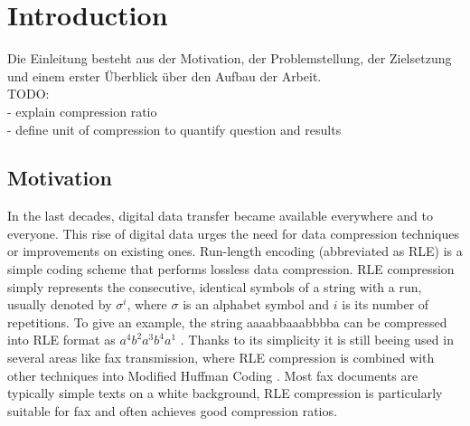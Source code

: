 
\chapter{Introduction}
\label{ch:Introduction}
Die Einleitung besteht aus der Motivation, der Problemstellung, der Zielsetzung und einem erster Überblick über den Aufbau der Arbeit. \\
TODO: \\
- explain compression ratio \\
- define unit of compression to quantify question and results \\

\section{Motivation}
\label{ch:Introduction:sec:Motivation}
\par{
In the last decades, digital data transfer became available everywhere and to everyone. This rise of digital data urges the need for data compression techniques or improvements on existing ones. Run-length encoding \cite{rle-patent} (abbreviated as RLE) is a simple coding scheme that performs lossless data compression. RLE compression simply represents the consecutive, identical symbols of a string with a run, usually denoted by $\sigma^i$, where $\sigma$ is an alphabet symbol and $i$ is its number of repetitions. To give an example, the string aaaabbaaabbbba can be compressed into RLE format as  $ a^{4}b^{2}a^{3}b^{4}a^{1}$ . Thanks to its simplicity it is still beeing used in several areas like fax transmission, where RLE compression is combined with other techniques into Modified Huffman Coding \cite{fax-rle}. Most fax documents are typically simple texts on a white background, RLE compression is particularly suitable for fax and often achieves good compression ratios.
}
